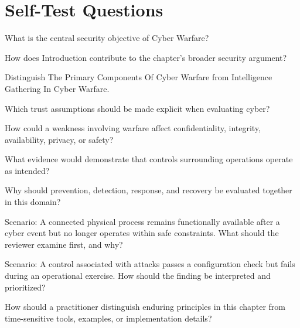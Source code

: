 \documentclass[11pt,letterpaper]{article}
\begin{document}
\section*{Self-Test Questions}
\begin{CornellRecallList}
\item What is the central security objective of Cyber Warfare?
\item How does Introduction contribute to the chapter's broader security argument?
\item Distinguish The Primary Components Of Cyber Warfare from Intelligence Gathering In Cyber Warfare.
\item Which trust assumptions should be made explicit when evaluating cyber?
\item How could a weakness involving warfare affect confidentiality, integrity, availability, privacy, or safety?
\item What evidence would demonstrate that controls surrounding operations operate as intended?
\item Why should prevention, detection, response, and recovery be evaluated together in this domain?
\item Scenario: A connected physical process remains functionally available after a cyber event but no longer operates within safe constraints. What should the reviewer examine first, and why?
\item Scenario: A control associated with attacks passes a configuration check but fails during an operational exercise. How should the finding be interpreted and prioritized?
\item How should a practitioner distinguish enduring principles in this chapter from time-sensitive tools, examples, or implementation details?
\end{CornellRecallList}
\end{document}
